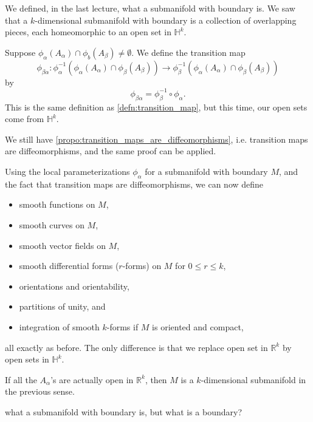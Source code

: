 \documentclass[notoc,notitlepage]{tufte-book}
\begin{document}
We defined, in the last lecture, what a submanifold with boundary is. We saw
that a $k$-dimensional submanifold with boundary is a collection of overlapping
pieces, each homeomorphic to an open set in $\mathbb{H}^k$.

Suppose $\phi_\alpha(A_\alpha) \cap \phi_b(A_\beta) \neq \emptyset$. We define
the transition map
\begin{equation*}
  \phi_{\beta\alpha} : \phi_\alpha^{-1}(\phi_\alpha(A_\alpha) \cap
  \phi_\beta(A_\beta)) \to \phi_\beta^{-1}(\phi_\alpha(A_\alpha) \cap
  \phi_\beta(A_\beta))
\end{equation*}
by
\begin{equation*}
  \phi_{\beta\alpha} = \phi_\beta^{-1} \circ \phi_\alpha.
\end{equation*}
This is the same definition as \cref{defn:transition_map}, but this time, our
open sets come from $\mathbb{H}^k$.

We still have \cref{propo:transition_maps_are_diffeomorphisms}, i.e. 
transition maps are diffeomorphisms, and the same proof can be applied.

\begin{remark}
  Using the local parameterizations $\phi_\alpha$ for a submanifold with boundary
  $M$, and the fact that transition maps are diffeomorphisms, we can now define
  \begin{itemize}
    \item smooth functions on $M$,
    \item smooth curves on $M$, 
    \item smooth vector fields on $M$,
    \item smooth differential forms ($r$-forms) on $M$ for $0 \leq r \leq k$,
    \item orientations and orientability,
    \item partitions of unity, and
    \item integration of smooth $k$-forms if $M$ is oriented and compact,
  \end{itemize}
  all exactly as before. The only difference is that we replace open set in
  $\mathbb{R}^k$ by open sets in $\mathbb{H}^k$.
\end{remark}

\begin{remark}
  If all the $A_\alpha$'s are actually open in $\mathbb{R}^k$, then $M$ is a
  $k$-dimensional submanifold in the previous sense.
\end{remark}

 what a submanifold with boundary is, but what is a
boundary?
\end{document}
